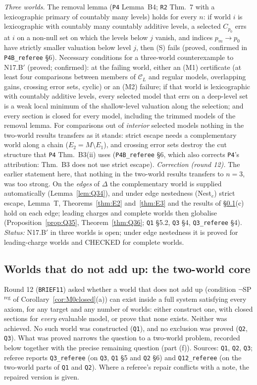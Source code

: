 \documentclass[11pt]{article}
\theoremstyle{definition}
\theoremstyle{remark}
\newcommand{\C}{\mathcal C}
\newcommand{\src}[1]{\texttt{#1}}
\begin{document}
\emph{Three worlds.} The removal lemma (\src{P4} Lemma~B4; \src{R2} Thm.~7 with a lexicographic primary of countably many levels) holds for every $n$: if world $i$ is lexicographic with countably many countably additive levels, a selected $C_{p_0}$ errs at $i$ on a non-null set on which the levels below $j$ vanish, and indices $p_m\to p_0$ have strictly smaller valuation below level $j$, then (S) fails (proved, confirmed in \src{P4B\_referee} \S6). Necessary conditions for a three-world counterexample to N17.B$'$ (proved; confirmed): at the failing world, either an (M1) certificate (at least four comparisons between members of $\C_L$ and regular models, overlapping gains, crossing error sets, cyclic) or an (M2) failure; if that world is lexicographic with countably additive levels, every selected model that errs on a deep-level set is a weak local minimum of the shallow-level valuation along the selection; and every section is closed for every model, including the trimmed models of the removal lemma. For comparisons out of \emph{interior} selected models nothing in the two-world results transfers as it stands: strict escape needs a complementary world along a chain ($E_2=M\setminus E_1$), and crossing error sets destroy the cut structure that \src{P4} Thm.~B3(ii) uses (\src{P4B\_referee} \S6, which also corrects \src{P4}'s attribution: Thm.~B3 does not use strict escape). \emph{Correction (round 12).} The earlier statement here, that nothing in the two-world results transfers to $n=3$, was too strong. On the \emph{edges} of $\Delta$ the complementary world is supplied automatically (Lemma~\ref{lem:Q34}), and under edge nestedness (Nest$_e$) strict escape, Lemma~T, Theorems~\ref{thm:E2} and~\ref{thm:E3} and the results of \S\ref{sec:open-core}(c) hold on each edge; leading charges and complete worlds then globalise (Proposition~\ref{prop:Q35}, Theorem~\ref{thm:Q36}; \src{Q1} \S5.2, \src{Q3} \S4, \src{Q3\_referee} \S4). \emph{Status:} N17.B$'$ in three worlds is open; under edge nestedness it is proved for leading-charge worlds and CHECKED for complete worlds.

\subsection{Worlds that do not add up: the two-world core}\label{sec:open-core}
Round 12 (\src{BRIEF11}) asked whether a world that does not add up (condition $\neg$SP$^{\mathrm{reg}}$ of Corollary~\ref{cor:M0closed}(a)) can exist inside a full system satisfying every axiom, for any target and any number of worlds: either construct one, with closed sections for \emph{every} evaluable model, or prove that none exists. Neither was achieved. No such world was constructed (\src{Q1}), and no exclusion was proved (\src{Q2}, \src{Q3}). What was proved narrows the question to a two-world problem, recorded below together with the precise remaining question (part (f)). Sources: \src{Q1}, \src{Q2}, \src{Q3}; referee reports \src{Q3\_referee} (on \src{Q3}, \src{Q1} \S5 and \src{Q2} \S6) and \src{Q12\_referee} (on the two-world parts of \src{Q1} and \src{Q2}). Where a referee's repair conflicts with a note, the repaired version is given.
\end{document}
